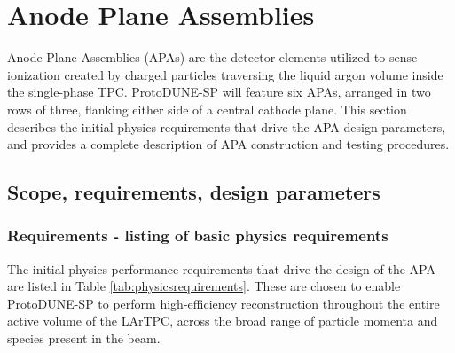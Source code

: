 
\section{Anode Plane Assemblies}

Anode Plane Assemblies (APAs) are the detector elements utilized to sense ionization created by charged particles traversing the liquid argon volume inside the single-phase TPC.  ProtoDUNE-SP will feature six APAs, arranged in two rows of three, flanking either side of a central cathode plane.  This section describes the initial physics requirements that drive the APA design parameters, and provides a complete description of APA construction and testing procedures.


\subsection{Scope, requirements, design parameters}


\subsubsection{Requirements - listing of basic physics requirements}

The initial physics performance requirements that drive the design of the APA are listed in Table \ref{tab:physicsrequirements}.  These are chosen to enable ProtoDUNE-SP to perform high-efficiency reconstruction throughout the entire active volume of the LArTPC, across the broad range of particle momenta and species present in the beam.  

